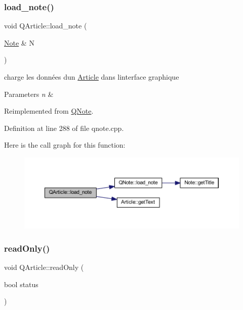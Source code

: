 \subsubsection{\texorpdfstring{load\+\_\+note()}{load\_note()}}
{\footnotesize\ttfamily void Q\+Article\+::load\+\_\+note (\begin{DoxyParamCaption}\item[{\hyperlink{class_note}{Note} \&}]{N }\end{DoxyParamCaption})\hspace{0.3cm}{\ttfamily [virtual]}}



charge les données d\textquotesingle{}un \hyperlink{class_article}{Article} dans l\textquotesingle{}interface graphique 


\begin{DoxyParams}{Parameters}
{\em n} & \\
\hline
\end{DoxyParams}


Reimplemented from \hyperlink{class_q_note_adca0a8f2851fbb1c3843ca4fe7957c11}{Q\+Note}.



Definition at line 288 of file qnote.\+cpp.

Here is the call graph for this function\+:\nopagebreak
\begin{figure}[H]
\begin{center}
\leavevmode
\includegraphics[width=350pt]{class_q_article_aea21c10581abe74709317283739e9552_cgraph}
\end{center}
\end{figure}
\mbox{\label{class_q_article_af6c14f4ce3df750a0e1a22207309068e}} 
\subsubsection{\texorpdfstring{read\+Only()}{readOnly()}}
{\footnotesize\ttfamily void Q\+Article\+::read\+Only (\begin{DoxyParamCaption}\item[{bool}]{status }\end{DoxyParamCaption})\hspace{0.3cm}{\ttfamily [virtual]}}



